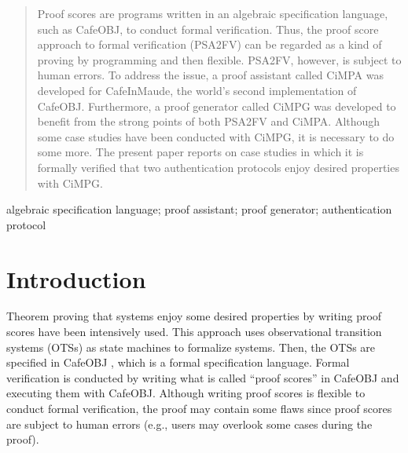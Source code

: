 \documentclass[10pt, conference, compsocconf]{IEEEtran}
\begin{document}
\begin{abstract}
Proof scores are programs written in an algebraic specification language, such as CafeOBJ, to conduct formal verification. Thus, the proof score approach to formal verification (PSA2FV) can be regarded as a kind of proving by programming and then flexible. PSA2FV, however, is subject to human errors. To address the issue, a proof assistant called CiMPA was developed for CafeInMaude, the world’s second implementation of CafeOBJ. Furthermore, a proof generator called CiMPG was developed to benefit from the strong points of both PSA2FV and CiMPA. Although some case studies have been conducted with CiMPG, it is necessary to do some more. The present paper reports on case studies in which it is formally verified that two authentication protocols enjoy desired properties with CiMPG.
\end{abstract}

\begin{IEEEkeywords}
algebraic specification language; proof assistant; proof generator; authentication protocol

\end{IEEEkeywords}


%
\IEEEpeerreviewmaketitle

\section{Introduction}
Theorem proving that systems enjoy some desired properties by writing proof scores have been intensively used.
This approach uses observational transition systems (OTSs) \cite{OgataF03fmoods} as state machines to formalize systems. 
Then, the OTSs are specified in CafeOBJ \cite{DiaconescuF98amast}, which is a formal specification language. 
Formal verification is conducted by writing what is called ``proof scores'' \cite{OgataF03fmoods} in CafeOBJ and executing them with CafeOBJ. 
Although writing proof scores is flexible to conduct formal verification, the proof may contain some flaws since proof scores are subject to human errors (e.g., users may overlook some cases during the proof).
\end{document}
